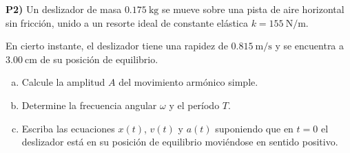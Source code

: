 \textbf{P2)} Un deslizador de masa $0.175\ \mathrm{kg}$ se mueve sobre una pista de aire horizontal sin fricción, unido a un resorte ideal de constante elástica $k = 155\ \mathrm{N/m}$.

En cierto instante, el deslizador tiene una rapidez de $0.815\ \mathrm{m/s}$ y se encuentra a $3.00\ \mathrm{cm}$ de su posición de equilibrio.

\begin{enumerate}[a)]
  \item Calcule la amplitud $A$ del movimiento armónico simple.
  \item Determine la frecuencia angular $\omega$ y el período $T$.
  \item Escriba las ecuaciones $x(t)$, $v(t)$ y $a(t)$ suponiendo que en $t = 0$ el deslizador está en su posición de equilibrio moviéndose en sentido positivo.
\end{enumerate}

\vspace{0.3cm}